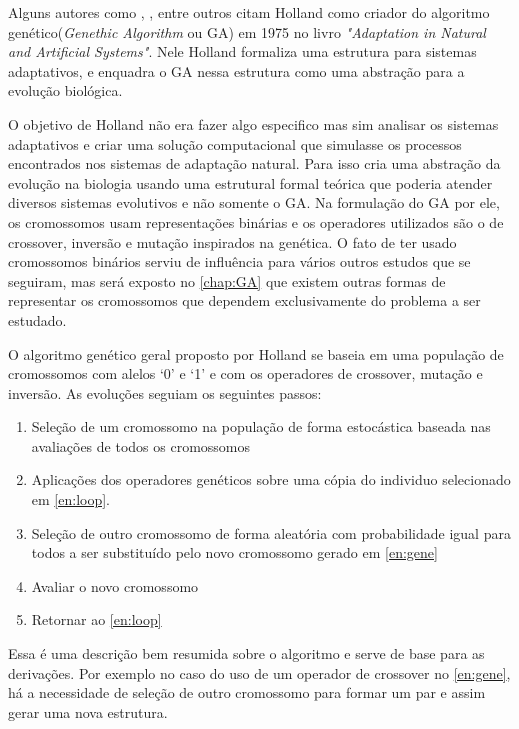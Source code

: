 Alguns autores como \citeauthor{Mitchell1996}, \citeauthor{LeeJacobson2015}, \citeauthor{Kwong2001} entre outros citam Holland como criador do algoritmo genético(\textit{Genethic Algorithm} ou GA) em 1975 no livro \textit{"Adaptation in Natural and Artificial Systems"}. Nele Holland formaliza uma estrutura para sistemas adaptativos, e enquadra o GA nessa estrutura como uma abstração para a evolução biológica.

O objetivo de Holland não era fazer algo especifico mas sim analisar os sistemas adaptativos e criar uma solução computacional que simulasse os processos encontrados nos sistemas de adaptação natural. Para isso cria uma abstração da evolução na biologia usando uma estrutural formal teórica que poderia atender diversos sistemas evolutivos e não somente o GA. Na formulação do GA por ele, os cromossomos usam representações binárias e os operadores utilizados são o de crossover, inversão e mutação inspirados na genética. O fato de ter usado cromossomos binários serviu de influência para vários outros estudos que se seguiram, mas será exposto no \autoref{chap:GA} que existem outras formas de representar os cromossomos que dependem exclusivamente do problema a ser estudado.

O algoritmo genético geral proposto por Holland se baseia em uma população de cromossomos com alelos `0' e `1' e com os operadores de crossover, mutação e inversão. As evoluções seguiam os seguintes passos: 
\begin{enumerate}
	\item \label{en:loop} Seleção de um cromossomo na população de forma estocástica baseada nas avaliações de todos os cromossomos
	\item \label{en:gene} Aplicações dos operadores genéticos sobre uma cópia do individuo selecionado em \ref{en:loop}.
	\item Seleção de outro cromossomo de forma aleatória com probabilidade igual para todos a ser substituído pelo novo cromossomo gerado em \ref{en:gene}
	\item Avaliar o novo cromossomo
	\item Retornar ao \ref{en:loop}
\end{enumerate}

Essa é uma descrição bem resumida sobre o algoritmo e serve de base para as derivações. Por exemplo no caso do uso de um operador de crossover no \autoref{en:gene}, há a necessidade de seleção de outro cromossomo para formar um par e assim gerar uma nova estrutura.

